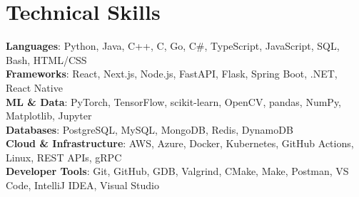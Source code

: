\documentclass[letterpaper,11pt]{article}
\begin{document}
\section{Technical Skills}

\begin{itemize}[leftmargin=0.15in, label={}]
  \small{\item{
    \textbf{Languages}{: Python, Java, C++, C, Go, C\#, TypeScript, JavaScript, SQL, Bash, HTML/CSS} \\
    \textbf{Frameworks}{: React, Next.js, Node.js, FastAPI, Flask, Spring Boot, .NET, React Native} \\
    \textbf{ML \& Data}{: PyTorch, TensorFlow, scikit-learn, OpenCV, pandas, NumPy, Matplotlib, Jupyter} \\
    \textbf{Databases}{: PostgreSQL, MySQL, MongoDB, Redis, DynamoDB} \\
    \textbf{Cloud \& Infrastructure}{: AWS, Azure, Docker, Kubernetes, GitHub Actions, Linux, REST APIs, gRPC} \\
    \textbf{Developer Tools}{: Git, GitHub, GDB, Valgrind, CMake, Make, Postman, VS Code, IntelliJ IDEA, Visual Studio} \\
  }}
\end{itemize}


\end{document}
